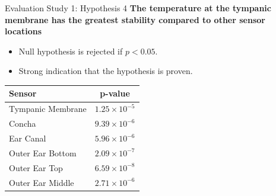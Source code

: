 \documentclass[en]{sdqbeamer}
\begin{document}
\begin{frame}{Evaluation Study 1: Hypothesis 4}
    \textbf{The temperature at the tympanic membrane has the greatest stability compared to other sensor locations}
    \begin{itemize}
        \item Null hypothesis is rejected if $p<0.05$.
        \item Strong indication that the hypothesis is proven.
    \end{itemize}
    \vspace{15pt}
    
    \begin{tabularx}{\textwidth}{|X|c|}
        \hline
        \textbf{Sensor} & \textbf{p-value} \\
        \hline
        Tympanic Membrane & \(1.25 \times 10^{-5}\) \\
        Concha & \(9.39 \times 10^{-6}\) \\
        Ear Canal & \(5.96 \times 10^{-6}\) \\
        Outer Ear Bottom & \(2.09 \times 10^{-7}\) \\
        Outer Ear Top & \(6.59 \times 10^{-8}\) \\
        Outer Ear Middle & \(2.71 \times 10^{-6}\) \\
        \hline
        \end{tabularx}
\end{frame}

\end{document}
